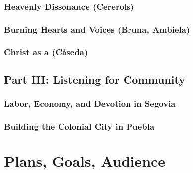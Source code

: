 \documentclass[tt]{vcbook-proposal}
\begin{document}
\subsubsection{Heavenly Dissonance (Cererols)}

\subsubsection{Burning Hearts and Voices (Bruna, Ambiela)}

\subsubsection{Christ as a  (Cáseda)}


\subsection{Part III: Listening for Community}

\subsubsection{Labor, Economy, and Devotion in Segovia}

\subsubsection{Building the Colonial City in Puebla}

\section{Plans, Goals, Audience}


\printbibliography
\end{document}
